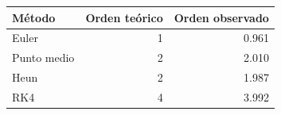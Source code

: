 \begin{tabular}{lrr}\toprule
Método & Orden teórico & Orden observado\\\midrule
Euler & 1 & 0.961\\
Punto medio & 2 & 2.010\\
Heun & 2 & 1.987\\
RK4 & 4 & 3.992\\
\bottomrule\end{tabular}